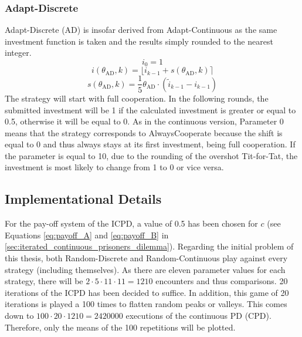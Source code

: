 \documentclass[11pt]{article}
\newcommand{\round}[1]{\ensuremath{\lfloor#1\rceil}}
\begin{document}
\subsubsection*{Adapt-Discrete}
Adapt-Discrete (AD) is insofar derived from Adapt-Continuous as the same investment function is taken and the results simply rounded to the nearest integer.
\begin{equation}
	i_0 = 1
	\label{eq:AD_i0}
\end{equation}
\begin{equation}
	i(\theta_{\mathrm{AD}}, k) = \round{i_{k-1} + s(\theta_{\mathrm{AD}}, k)}
	\label{eq:AD_i_eq}
\end{equation}
\begin{equation}
	s(\theta_{\mathrm{AD}}, k) = \frac{1}{5} \theta_{\mathrm{AD}} \cdot (\tilde{i}_{k-1} - i_{k-1})
	\label{eq:AD_s_eq}
\end{equation}
The strategy will start with full cooperation.
In the following rounds, the submitted investment will be 1 if the calculated investment is greater or equal to 0.5, otherwise it will be equal to 0.
As in the continuous version, Parameter 0 means that the strategy corresponds to AlwaysCooperate because the shift is equal to 0 and thus always stays at its first investment, being full cooperation.
If the parameter is equal to 10, due to the rounding of the overshot Tit-for-Tat, the investment is most likely to change from 1 to 0 or vice versa.

\subsection{Implementational Details} \label{sec:implementational_details}

For the pay-off system of the ICPD, a value of 0.5 has been chosen for $c$ (see Equations \ref{eq:payoff_A} and \ref{eq:payoff_B} in \ref{sec:iterated_continuous_prisoners_dilemma}).
Regarding the initial problem of this thesis, both Random-Discrete and Random-Continuous play against every strategy (including themselves).
As there are eleven parameter values for each strategy, there will be $2 \cdot 5 \cdot 11 \cdot 11 = 1210$ encounters and thus comparisons.
20 iterations of the ICPD has been decided to suffice.
In addition, this game of 20 iterations is played a 100 times to flatten random peaks or valleys.
This comes down to $100 \cdot 20 \cdot 1210 = 2420000$ executions of the continuous PD (CPD).
Therefore, only the means of the 100 repetitions will be plotted.
\end{document}
